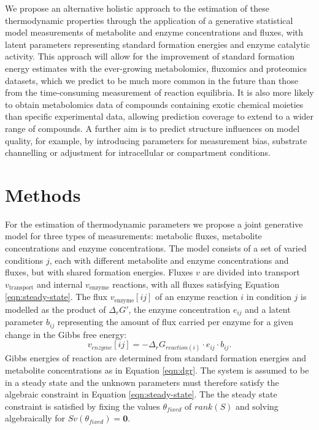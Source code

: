 \documentclass[11pt]{article}
\begin{document}
	We propose an alternative holistic approach to the estimation of these thermodynamic properties through the application
	of a generative statistical model measurements of metabolite and enzyme concentrations and fluxes, with latent
	parameters representing standard formation energies and enzyme catalytic activity.
	This approach will allow for the improvement of standard formation energy estimates with the ever-growing
	metabolomics, fluxomics and proteomics datasets, which we predict to be much more common in the future than
	those from the time-consuming measurement of reaction equilibria.
	It is also more likely to obtain metabolomics data of compounds containing exotic chemical moieties than specific experimental data, allowing prediction coverage to extend to a wider range of compounds.
	A further aim is to predict structure influences on model quality, for example, by introducing parameters for measurement
	bias, substrate channelling or adjustment for intracellular or compartment conditions.

	\section{Methods}
	For the estimation of thermodynamic parameters we propose a joint generative model for three types of measurements:
	metabolic fluxes, metabolite concentrations and enzyme concentrations.
	The model consists of a set of varied conditions $j$, each with different metabolite and enzyme concentrations and fluxes,
	but with shared formation energies.
	Fluxes $v$ are divided into transport $v_{\text{transport}}$ and internal $v_{\text{enzyme}}$ reactions, with all fluxes
	satisfying Equation \ref{eqn:steady-state}.
	The flux $v_{\text{enzyme}}[ij]$ of an enzyme reaction $i$ in condition $j$ is modelled as the product of $\Delta_rG'$,
	the enzyme concentration $e_{ij}$ and a latent parameter $b_{ij}$ representing the amount of flux carried per
	enzyme for a given change in the Gibbs free energy:
	\[
	v_{enzyme}[ij] = -\Delta_rG_{reaction(i)} \cdot e_{ij} \cdot b_{ij}.
	\]
	Gibbs energies of reaction are determined from standard formation energies and metabolite concentrations as in
	Equation \ref{eqn:dgr}.
	The system is assumed to be in a steady state and the unknown parameters
	must therefore satisfy the algebraic constraint in Equation \ref{eqn:steady-state}.
	The the steady state constraint is satisfied by fixing the values $\theta_{fixed}$ of $rank(S)$ and solving
	algebraically for $Sv(\theta_{fixed}) = \mathbf{0}$. \\
\end{document}
